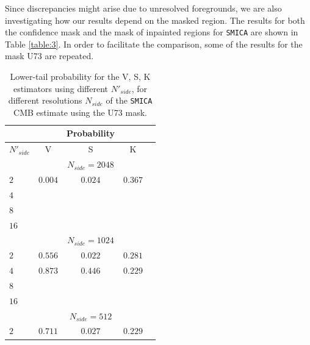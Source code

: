 Since discrepancies might arise due to unresolved foregrounds, we are also investigating how our results depend on the masked region. The results for both the confidence mask and the mask of inpainted regions for \texttt{SMICA} are shown in Table \ref{table:3}. In order to facilitate the comparison, some of the results for the mask U73 are repeated. %

\begin{table}
\centering
\caption{Lower-tail probability for the V, S, K estimators using different $N'_{side}$, for different resolutions $N_{side}$ of the  \texttt{SMICA} CMB estimate using the U73 mask.}
\label{table:2}
\begin{tabular}{@{}lcccc}
\hline 
  & & Probability & \\
\hline  
$N'_{side}$ & V & S & K \\ 
\hline  
 & & $N_{side}=2048$ & \\
$2$ & $0.004 $ & $ 0.024$ & $0.367 $ \\ 
$4$ & $ $ & $ $ & $ $  \\
$8$ & $ $ & $  $ & $  $  \\
$16$ & $  $ & $  $ & $  $  \\
 & & $ N_{side} = 1024 $ & \\
$2$ & $ 0.556 $ & $ 0.022 $ & $ 0.281 $ \\ 
$4$ & $ 0.873 $ & $ 0.446 $ & $ 0.229 $  \\
$8$ & $  $ & $  $ & $  $  \\
$16$ & $  $ & $  $ & $  $  \\
 & & $N_{side} = 512$ & \\
$2$ & $0.711 $ & $ 0.027 $ & $ 0.229 $ \\ 

\end{tabular}
\end{table}

